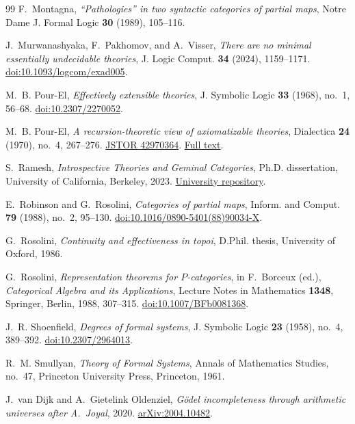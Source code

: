 \begin{thebibliography}{99}
F.~Montagna, \emph{``Pathologies'' in two syntactic categories of partial
maps}, Notre Dame J. Formal Logic \textbf{30} (1989), 105--116.

J.~Murwanashyaka, F.~Pakhomov, and A.~Visser,
\emph{There are no minimal essentially undecidable theories},
J. Logic Comput. \textbf{34} (2024), 1159--1171.
\href{https://doi.org/10.1093/logcom/exad005}{doi:10.1093/logcom/exad005}.

M.~B. Pour-El, \emph{Effectively extensible theories},
J. Symbolic Logic \textbf{33} (1968), no.~1, 56--68.
\href{https://doi.org/10.2307/2270052}{doi:10.2307/2270052}.

M.~B. Pour-El, \emph{A recursion-theoretic view of axiomatizable theories},
Dialectica \textbf{24} (1970), no.~4, 267--276.
\href{https://www.jstor.org/stable/42970364}{JSTOR 42970364}.
\href{https://pi.math.cornell.edu/~yytran/PourEl_recursion_axiomatizable_theories.pdf}{Full text}.

S.~Ramesh, \emph{Introspective Theories and Geminal Categories},
Ph.D. dissertation, University of California, Berkeley, 2023.
\href{https://escholarship.org/uc/item/3mn0c475}{University repository}.

E.~Robinson and G.~Rosolini, \emph{Categories of partial maps},
Inform. and Comput. \textbf{79} (1988), no.~2, 95--130.
\href{https://doi.org/10.1016/0890-5401(88)90034-X}{doi:10.1016/0890-5401(88)90034-X}.

G.~Rosolini, \emph{Continuity and effectiveness in topoi}, D.Phil.
thesis, University of Oxford, 1986.

G.~Rosolini, \emph{Representation theorems for $P$-categories},
in F.~Borceux (ed.), \emph{Categorical Algebra and its Applications},
Lecture Notes in Mathematics \textbf{1348}, Springer, Berlin, 1988,
307--315. \href{https://doi.org/10.1007/BFb0081368}{doi:10.1007/BFb0081368}.

J.~R. Shoenfield, \emph{Degrees of formal systems},
J. Symbolic Logic \textbf{23} (1958), no.~4, 389--392.
\href{https://doi.org/10.2307/2964013}{doi:10.2307/2964013}.

R.~M. Smullyan, \emph{Theory of Formal Systems},
Annals of Mathematics Studies, no.~47, Princeton University Press,
Princeton, 1961.

J.~van Dijk and A.~Gietelink Oldenziel,
\emph{G\"odel incompleteness through arithmetic universes after A.~Joyal},
2020. \href{https://arxiv.org/abs/2004.10482}{arXiv:2004.10482}.


\end{thebibliography}

